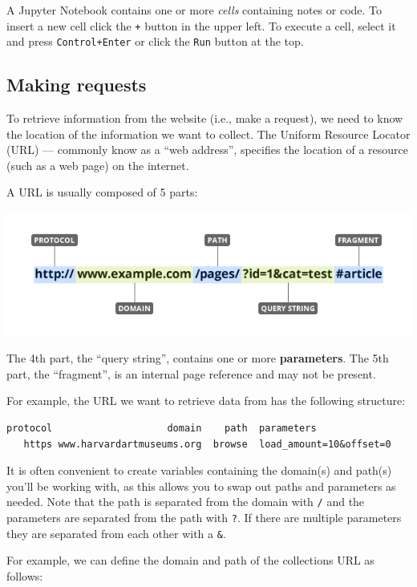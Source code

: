 \documentclass[
]{book}
\begin{document}
A Jupyter Notebook contains one or more \emph{cells} containing notes or code. To insert a new cell click the \texttt{+} button in the upper left. To execute a cell, select it and press \texttt{Control+Enter} or click the \texttt{Run} button at the top.

\hypertarget{making-requests}{%
\subsection{Making requests}\label{making-requests}}

To retrieve information from the website (i.e., make a request),
we need to know the location of the information we want to collect.
The Uniform Resource Locator (URL) --- commonly know as a ``web address'',
specifies the location of a resource (such as a web page) on the internet.

A URL is usually composed of 5 parts:

\includegraphics{Python/PythonWebScrape/images/URL.png}

The 4th part, the ``query string'', contains one or more \textbf{parameters}.
The 5th part, the ``fragment'', is an internal page reference and may not be present.

For example, the URL we want to retrieve data from has the following structure:

\begin{verbatim}
protocol                    domain    path  parameters
   https www.harvardartmuseums.org  browse  load_amount=10&offset=0
\end{verbatim}

It is often convenient to create variables containing the domain(s)
and path(s) you'll be working with, as this allows you to swap out
paths and parameters as needed. Note that the path is separated from
the domain with \texttt{/} and the parameters are separated from the path
with \texttt{?}. If there are multiple parameters they are separated from
each other with a \texttt{\&}.

For example, we can define the domain and path of the collections URL
as follows:
\end{document}
